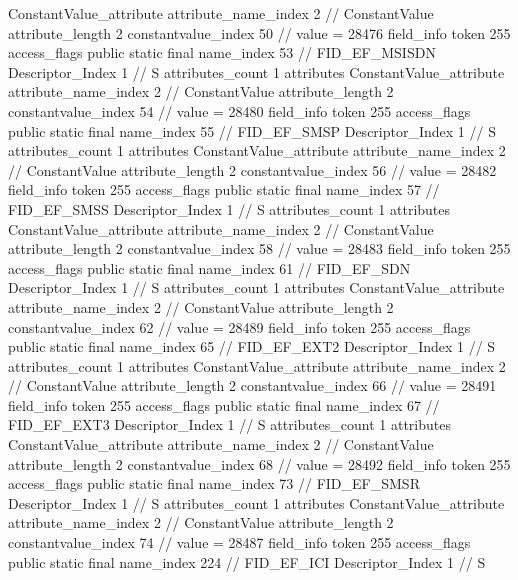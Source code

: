 {{{{{{				ConstantValue_attribute {
					attribute_name_index	2		// ConstantValue
					attribute_length	2
					constantvalue_index	50		// value = 28476
				}
				}
			}
			field_info {
				token	255
				access_flags	public static final
				name_index	53		// FID_EF_MSISDN
				Descriptor_Index	1		// S
				attributes_count	1
				attributes {
				ConstantValue_attribute {
					attribute_name_index	2		// ConstantValue
					attribute_length	2
					constantvalue_index	54		// value = 28480
				}
				}
			}
			field_info {
				token	255
				access_flags	public static final
				name_index	55		// FID_EF_SMSP
				Descriptor_Index	1		// S
				attributes_count	1
				attributes {
				ConstantValue_attribute {
					attribute_name_index	2		// ConstantValue
					attribute_length	2
					constantvalue_index	56		// value = 28482
				}
				}
			}
			field_info {
				token	255
				access_flags	public static final
				name_index	57		// FID_EF_SMSS
				Descriptor_Index	1		// S
				attributes_count	1
				attributes {
				ConstantValue_attribute {
					attribute_name_index	2		// ConstantValue
					attribute_length	2
					constantvalue_index	58		// value = 28483
				}
				}
			}
			field_info {
				token	255
				access_flags	public static final
				name_index	61		// FID_EF_SDN
				Descriptor_Index	1		// S
				attributes_count	1
				attributes {
				ConstantValue_attribute {
					attribute_name_index	2		// ConstantValue
					attribute_length	2
					constantvalue_index	62		// value = 28489
				}
				}
			}
			field_info {
				token	255
				access_flags	public static final
				name_index	65		// FID_EF_EXT2
				Descriptor_Index	1		// S
				attributes_count	1
				attributes {
				ConstantValue_attribute {
					attribute_name_index	2		// ConstantValue
					attribute_length	2
					constantvalue_index	66		// value = 28491
				}
				}
			}
			field_info {
				token	255
				access_flags	public static final
				name_index	67		// FID_EF_EXT3
				Descriptor_Index	1		// S
				attributes_count	1
				attributes {
				ConstantValue_attribute {
					attribute_name_index	2		// ConstantValue
					attribute_length	2
					constantvalue_index	68		// value = 28492
				}
				}
			}
			field_info {
				token	255
				access_flags	public static final
				name_index	73		// FID_EF_SMSR
				Descriptor_Index	1		// S
				attributes_count	1
				attributes {
				ConstantValue_attribute {
					attribute_name_index	2		// ConstantValue
					attribute_length	2
					constantvalue_index	74		// value = 28487
				}
				}
			}
			field_info {
				token	255
				access_flags	public static final
				name_index	224		// FID_EF_ICI
				Descriptor_Index	1		// S
}}}}}
